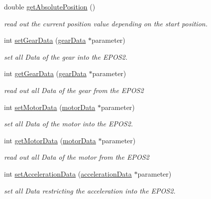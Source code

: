 \begin{DoxyCompactItemize}
double \hyperlink{classEpos2MotorController_a07b5def07609a91cba8a1977f6436c0a}{get\-Absolute\-Position} ()
\begin{DoxyCompactList}\small\item\em read out the current position value depending on the start position. \end{DoxyCompactList}\item 
int \hyperlink{classEpos2MotorController_a6c806fba7028bed11d710c4f453869b1}{set\-Gear\-Data} (\hyperlink{structEpos2MotorController_1_1gearData}{gear\-Data} $\ast$parameter)
\begin{DoxyCompactList}\small\item\em set all Data of the gear into the E\-P\-O\-S2. \end{DoxyCompactList}\item 
int \hyperlink{classEpos2MotorController_a43b5c84e3d2c891a98fae2c159d0a112}{get\-Gear\-Data} (\hyperlink{structEpos2MotorController_1_1gearData}{gear\-Data} $\ast$parameter)
\begin{DoxyCompactList}\small\item\em read out all Data of the gear from the E\-P\-O\-S2 \end{DoxyCompactList}\item 
int \hyperlink{classEpos2MotorController_a0a5257b20692de37091544e6ed5f6aed}{set\-Motor\-Data} (\hyperlink{structEpos2MotorController_1_1motorData}{motor\-Data} $\ast$parameter)
\begin{DoxyCompactList}\small\item\em set all Data of the motor into the E\-P\-O\-S2. \end{DoxyCompactList}\item 
int \hyperlink{classEpos2MotorController_a0b70bbbfed4fa0c78a9f15dfb593bb9f}{get\-Motor\-Data} (\hyperlink{structEpos2MotorController_1_1motorData}{motor\-Data} $\ast$parameter)
\begin{DoxyCompactList}\small\item\em read out all Data of the motor from the E\-P\-O\-S2 \end{DoxyCompactList}\item 
int \hyperlink{classEpos2MotorController_aada27a05c4f5150f7b2d2b3ec20a8f84}{set\-Acceleration\-Data} (\hyperlink{structEpos2MotorController_1_1accelerationData}{acceleration\-Data} $\ast$parameter)
\begin{DoxyCompactList}\small\item\em set all Data restricting the acceleration into the E\-P\-O\-S2. \end{DoxyCompactList}\item 

\end{DoxyCompactItemize}
